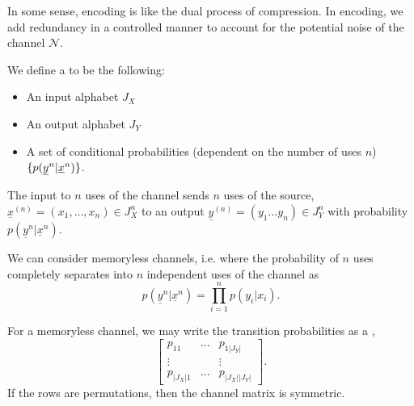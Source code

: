In some sense, encoding is like the dual process of compression. In encoding, we add redundancy in a controlled manner to account for the potential noise of the channel $\mathcal{N}$.

\begin{defn}
    We define a  to be the following:
    \begin{itemize}
        \item An input alphabet $J_X$
        \item An output alphabet $J_Y$
        \item A set of conditional probabilities (dependent on the number of uses $n$) $\{p(\underline y^{n}| \underline x^{n})\}$.
    \end{itemize}
\end{defn}
The input to $n$ uses of the channel sends $n$ uses of the source, $\underline{x}^{(n)}=(x_1,\ldots, x_n)\in J_X^n$ to an output $\underline{y}^{(n)}=(y_1\ldots y_n)\in J_Y^n$ with probability $p(\underline y^{n}| \underline x^{n})$.

We can consider memoryless channels, i.e. where the probability of $n$ uses completely separates into $n$ independent uses of the channel as
\begin{equation}
    p(\underline y^{n}| \underline x^{n}) = \prod_{i=1}^n p(y_i | x_i).
\end{equation}

For a memoryless channel, we may write the transition probabilities as a ,
\begin{equation}
    \begin{bmatrix}
    p_{11} & \ldots & p_{1|J_Y|}\\
    \vdots & & \vdots\\
    p_{|J_X|1} & \ldots &p_{|J_X||J_Y|}
    \end{bmatrix}.
\end{equation}
If the rows are permutations, then the channel matrix is symmetric.

